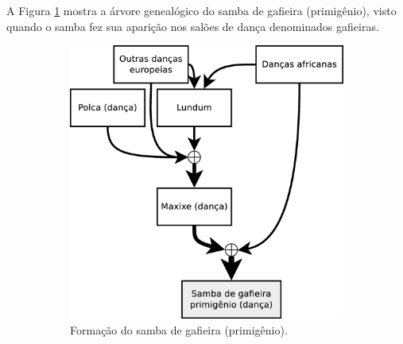 A Figura \ref{fig:formuladosambagafieira} mostra a árvore genealógico do samba de gafieira (primigênio),
visto quando o samba fez sua aparição nos salões de dança denominados gafieiras.
\begin{figure}[h]
  \centering
  \begin{subfigure}[b]{0.535\textwidth}
    \centering
    \includegraphics[width=\textwidth]{chapters/cap-historia-sambagafieira/sambagafieiraformula.eps}
    \caption{Formação do samba de gafieira (primigênio).}
    \label{fig:formuladosambagafieira}
  \end{subfigure}
  \begin{subfigure}[b]{0.385\textwidth}
    \centering

\end{subfigure}
\end{figure}
